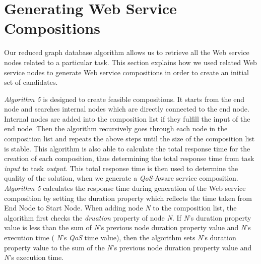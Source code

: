 \section{Generating Web Service Compositions} \label{generatingComp}
Our reduced graph database algorithm allows us to retrieve all the Web service nodes related to a particular task. This section explains how we used related Web service nodes to generate Web service compositions in order to create an initial set of candidates.\par

\emph{Algorithm 5} is designed to create feasible compositions. It starts from the end node and searches internal nodes which are directly connected to the end node. Internal nodes are added into the composition list if they fulfill the input of the end node. Then the algorithm recursively goes through each node in the composition list and repeats the above steps until the size of the composition list is stable. This algorithm is also able to calculate the total response time for the creation of each composition, thus determining the total response time from task \emph{input} to task \emph{output}. This total  response time is then used to determine the quality of the solution, when we generate a \emph{QoS}-Aware service composition. \emph{Algorithm 5} calculates the response time during generation of the Web service composition by setting the duration property which reflects the time taken from End Node to Start Node. When adding node \emph{N} to the composition list, the algorithm first checks the \emph{druation} property of node \emph{N}. If \emph{N}'s duration property value is less than the sum of \emph{N}'s previous node  duration property value and  \emph{N}'s execution time ( \emph{N}'s \emph{QoS} time value), then the algorithm sets  \emph{N}'s duration property value to the sum of the  \emph{N}'s previous node duration property value and  \emph{N}'s execution time.\par

